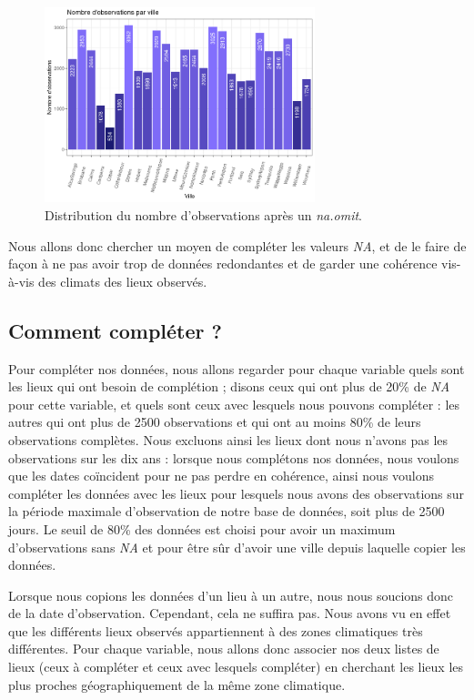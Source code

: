 \documentclass{article}
\begin{document}
\begin{figure}[htp]
    \centering
    \includegraphics[width=0.7\textwidth]{Images/distribution_lieux_raw.png}
    \caption{Distribution du nombre d'observations après un \emph{na.omit}.}
    \label{fig:distrib_raw}
\end{figure}

Nous allons donc chercher un moyen de compléter les valeurs \emph{NA}, et de le faire de façon à ne pas avoir trop de données redondantes et de garder une cohérence vis-à-vis des climats des lieux observés.

\subsection{Comment compléter ?}

Pour compléter nos données, nous allons regarder pour chaque variable quels sont les lieux qui ont besoin de complétion ; disons ceux qui ont plus de 20\% de \emph{NA} pour cette variable, et quels sont ceux avec lesquels nous pouvons compléter : les autres qui ont plus de 2500 observations et qui ont au moins 80\% de leurs observations complètes. Nous excluons ainsi les lieux dont nous n'avons pas les observations sur les dix ans : lorsque nous complétons nos données, nous voulons que les dates coïncident pour ne pas perdre en cohérence, ainsi nous voulons compléter les données avec les lieux pour lesquels nous avons des observations sur la période maximale d'observation de notre base de données, soit plus de 2500 jours. Le seuil de 80\% des données est choisi pour avoir un maximum d'observations sans \emph{NA} et pour être sûr d'avoir une ville depuis laquelle copier les données.

Lorsque nous copions les données d'un lieu à un autre, nous nous soucions donc de la date d'observation. Cependant, cela ne suffira pas. Nous avons vu en effet que les différents lieux observés appartiennent à des zones climatiques très différentes. Pour chaque variable, nous allons donc associer nos deux listes de lieux (ceux à compléter et ceux avec lesquels compléter) en cherchant les lieux les plus proches géographiquement de la même zone climatique. 
\end{document}
